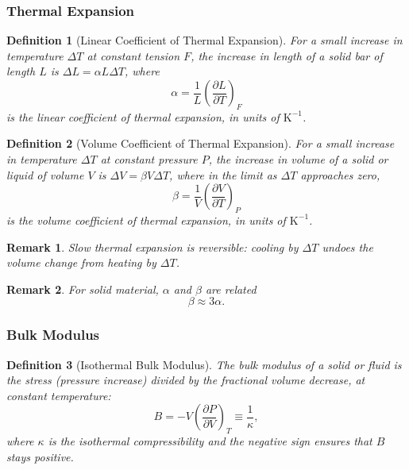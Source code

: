 \documentclass{article}
\newtheorem{definition}{Definition}
\newtheorem{remark}{Remark}
\begin{document}
\subsubsection{Thermal Expansion}
\begin{definition}[Linear Coefficient of Thermal Expansion]
    For a small increase in temperature $\Delta T$ at constant tension $F$, the increase in length of a solid bar of length $L$ is $\Delta L = \alpha L \Delta T$, where
    \begin{equation}
        \alpha = \frac{1}{L}\left(\frac{\partial L}{\partial T}\right)_F
    \end{equation}
    is the linear coefficient of thermal expansion, in units of $\text{K}^{-1}$.
\end{definition}
\begin{definition}[Volume Coefficient of Thermal Expansion]
    For a small increase in temperature $\Delta T$ at constant pressure $P$, the increase in volume of a solid or liquid of volume $V$ is $\Delta V = \beta V \Delta T$, where in the limit as $\Delta T$ approaches zero,
    \begin{equation}
        \beta = \frac{1}{V}\left(\frac{\partial V}{\partial T}\right)_P
    \end{equation}
    is the volume coefficient of thermal expansion, in units of $\text{K}^{-1}$.
\end{definition}
\begin{remark}
    Slow thermal expansion is reversible: cooling by $\Delta T$ undoes the volume change from heating by $\Delta T$.
\end{remark}
\begin{remark}
    For solid material, $\alpha$ and $\beta$ are related
    \[\beta \approx 3\alpha.\]
\end{remark}

\subsubsection{Bulk Modulus}
\begin{definition}[Isothermal Bulk Modulus]
    The bulk modulus of a solid or fluid is the stress (pressure increase) divided by the fractional volume decrease, at constant temperature:
    \begin{equation}
        B = -V\left(\frac{\partial P}{\partial V}\right)_T \equiv \frac{1}{\kappa},
    \end{equation}
    where $\kappa$ is the isothermal compressibility and the negative sign ensures that $B$ stays positive.
\end{definition}
\end{document}
